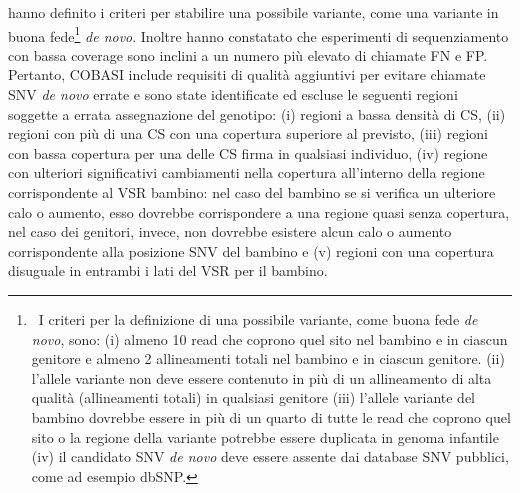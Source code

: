 \documentclass[../main.tex]{subfiles}
\begin{document}
\cite{gomez-romero2018cobasi} hanno definito i criteri per stabilire una possibile variante, come una variante in buona fede\footnote{\ I criteri per la definizione di una possibile variante, come buona fede \textit{de novo}, sono: (i) almeno 10 read che coprono quel sito nel bambino e in ciascun genitore e almeno 2 allineamenti totali nel bambino e in ciascun genitore. (ii) l'allele variante non deve essere contenuto in più di un allineamento di alta qualità (allineamenti totali) in qualsiasi genitore (iii) l'allele variante del bambino dovrebbe essere in più di un quarto di tutte le read che coprono quel sito o la regione della variante potrebbe essere duplicata in genoma infantile (iv) il candidato SNV \textit{de novo} deve essere assente dai database SNV pubblici, come ad esempio dbSNP.} \textit{de novo}. Inoltre hanno constatato che esperimenti di sequenziamento con bassa coverage sono inclini a un numero più elevato di chiamate FN e FP. Pertanto, COBASI include requisiti di qualità aggiuntivi per evitare chiamate SNV \textit{de novo} errate e sono state identificate ed escluse le seguenti regioni soggette a errata assegnazione del genotipo: (i) regioni a bassa densità di CS, (ii) regioni con più di una CS con una copertura superiore al previsto, (iii) regioni con bassa copertura per una delle CS firma in qualsiasi individuo, (iv) regione con ulteriori significativi cambiamenti nella copertura all'interno della regione corrispondente al VSR bambino: nel caso del bambino se si verifica un ulteriore calo o aumento, esso dovrebbe corrispondere a una regione quasi senza copertura, nel caso dei genitori, invece, non dovrebbe esistere alcun calo o aumento corrispondente alla posizione SNV del bambino e (v) regioni con una copertura disuguale in entrambi i lati del VSR per il bambino.
\end{document}

